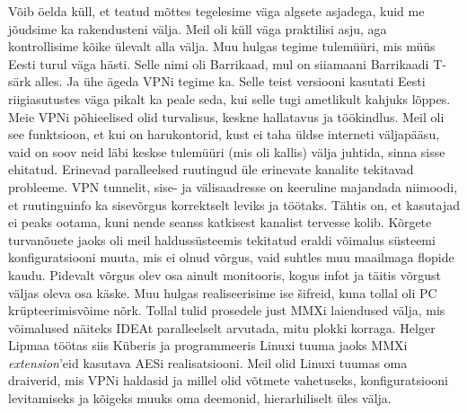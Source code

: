 
Võib öelda küll, et teatud mõttes tegelesime väga
algsete asjadega, kuid me jõudsime ka rakendusteni välja. Meil oli küll 
väga praktilisi asju, aga kontrollisime kõike 
ülevalt alla välja. Muu hulgas tegime tulemüüri, mis müüs Eesti turul väga 
hästi. Selle nimi oli Barrikaad, mul on 
siiamaani Barrikaadi T-särk alles. Ja ühe ägeda VPNi tegime ka. Selle teist versiooni kasutati Eesti riigiasutustes 
väga pikalt ka peale seda, kui selle tugi ametlikult kahjuks
lõppes. Meie VPNi põhieelised olid 
turvalisus, keskne hallatavus ja töökindlus. Meil oli see funktsioon, et kui 
on harukontorid, kust ei taha üldse interneti väljapääsu, vaid on soov neid läbi 
keskse tulemüüri (mis oli kallis) välja juhtida, sinna sisse 
ehitatud. Erinevad paralleelsed ruutingud üle erinevate kanalite tekitavad probleeme. VPN tunnelit, sise- ja 
välisaadresse on keeruline majandada niimoodi, et ruutinguinfo ka 
sisevõrgus korrektselt leviks ja töötaks. Tähtis on, et kasutajad 
ei peaks ootama, kuni nende seanss katkisest kanalist tervesse kolib. 
Kõrgete turvanõuete jaoks oli meil haldussüsteemis tekitatud eraldi 
võimalus süsteemi konfiguratsiooni muuta, mis ei olnud võrgus, vaid 
suhtles muu maailmaga flopide kaudu. Pidevalt võrgus olev osa ainult monitooris, kogus infot ja 
täitis võrgust väljas oleva osa käske. Muu hulgas realiseerisime ise šifreid, kuna tollal oli PC krüpteerimisvõime nõrk. Tollal tulid prosedele just MMXi laiendused välja, 
mis võimalused näiteks IDEAt paralleelselt arvutada, mitu plokki korraga. Helger Lipmaa töötas siis Küberis ja 
programmeeris Linuxi tuuma jaoks MMXi \emph{extension}'eid kasutava 
AESi  
realisatsiooni. Meil olid Linuxi tuumas oma draiverid, mis 
VPNi haldasid ja millel olid võtmete vahetuseks, konfiguratsiooni 
levitamiseks ja kõigeks muuks oma deemonid, hierarhiliselt üles välja.

